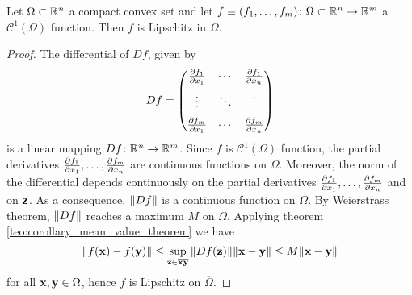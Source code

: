 \begin{theorem} \label{teo:c1_function_implies_lipschitz}
	Let $\Omega \subset \mathbb{R}^n$ a compact convex set and let $f \equiv (f_1, \ldots, f_m) \colon \Omega \subset \mathbb{R}^n \to \mathbb{R}^m$ a $\mathcal{C}^1(\Omega)$ function. Then $f$ is Lipschitz in $\Omega$.
\end{theorem}
\begin{proof}
	The differential of $D f$, given by
	\begin{equation}
		D f = 
		\begin{pmatrix}
			\pdv{f_1}{x_1} & \cdots & \pdv{f_1}{x_n} \\[6pt]
			\vdots & \ddots & \vdots \\[6pt]
			\pdv{f_m}{x_1} & \cdots & \pdv{f_m}{x_n} \\
		\end{pmatrix}
	\end{equation}
	is a linear mapping $D f \colon \mathbb{R}^n \rightarrow \mathbb{R}^m$. Since $f$ is $\mathcal{C}^1(\Omega)$ function, the partial derivatives $\pdv{f_1}{x_1}, \ldots, \pdv{f_m}{x_n}$ are continuous functions on $\Omega$. Moreover, the norm of the differential depends continuously on the partial derivatives $\pdv{f_1}{x_1}, \ldots, \pdv{f_m}{x_n}$ and on $\vb{z}$. As a consequence, $\norm{D f}$ is a continuous function on $\Omega$. By Weierstrass theorem, $\norm{D f}$ reaches a maximum $M$ on $\Omega$. Applying theorem \ref{teo:corollary_mean_value_theorem} we have 
	\begin{equation}
		\norm{f(\vb{x}) - f(\vb{y})} \leq \sup_{\vb{z} \in 
		\overline{\vb{x}\vb{y}}} \norm{D f(\vb{z})} \norm{\vb{x} - \vb{y}} \leq
		M \norm{\vb{x} - \vb{y}}
	\end{equation}
	for all $\vb{x}, \vb{y} \in \Omega$, hence $f$ is Lipschitz on $\overline{\Omega}$.
\end{proof}

%
%

